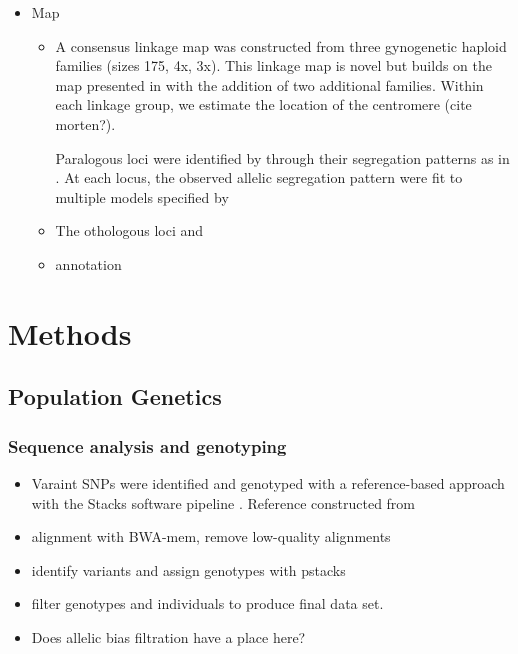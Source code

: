 \documentclass[12pt,  one column]{article}
\begin{document}
\begin{itemize}
\item Map
\begin{itemize}
\item A consensus linkage map was constructed from three gynogenetic haploid families (sizes 175, 4x, 3x). This linkage map is novel but builds on the map presented in \citet{Waples2015} with the addition of two additional families.  Within each linkage group, we estimate the location of the centromere (cite morten?).  

Paralogous loci were identified by through their segregation patterns as in \citet{Waples2015}.  At each locus, the observed allelic segregation pattern were fit to multiple models specified by 

\item The othologous loci and 
\item annotation
\end{itemize}

\end{itemize}


\section*{Methods}

\subsection*{Population Genetics}
\subsubsection*{Sequence analysis and genotyping}
\begin{itemize}[nosep]
\item Varaint SNPs were identified and genotyped with a reference-based approach with the Stacks software pipeline \cite{Catchen2013}.  Reference constructed from \citet{Waples2015}
\item alignment with BWA-mem, remove low-quality alignments
\item identify variants and assign genotypes with pstacks
\item filter genotypes and individuals to produce final data set. 
\item Does allelic bias filtration have a place here?
\end{itemize}
\end{document}
